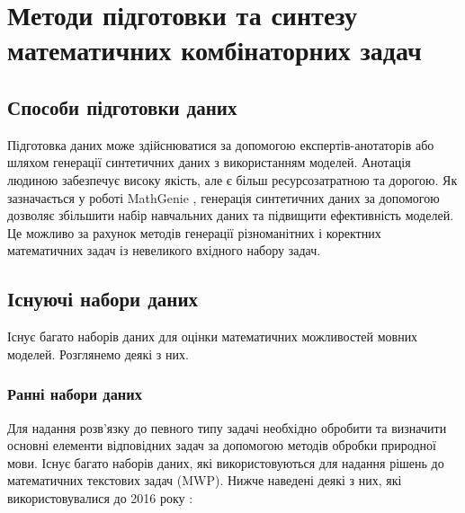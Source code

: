 \chapter{Методи підготовки та синтезу математичних комбінаторних задач}
\label{sec:datasets}

\section{Способи підготовки даних}

Підготовка даних може здійснюватися за допомогою експертів-анотаторів або шляхом генерації синтетичних даних з використанням моделей. Анотація людиною забезпечує високу якість, але є більш ресурсозатратною та дорогою. Як зазначається у роботі MathGenie \cite{lu2024mathgeniegeneratingsyntheticdata}, генерація синтетичних даних за допомогою дозволяє збільшити набір навчальних даних та підвищити ефективність моделей. Це можливо за рахунок методів генерації різноманітних і коректних математичних задач із невеликого вхідного набору задач.

\section{Існуючі набори даних}

Існує багато наборів даних для оцінки математичних можливостей мовних моделей. Розглянемо деякі з них.

\subsection{Ранні набори даних}
Для надання розв'язку до певного типу задачі необхідно обробити та визначити основні елементи відповідних задач за допомогою методів обробки природної мови. Існує багато наборів даних, які використовуються для надання рішень до математичних текстових задач (MWP). Нижче наведені деякі з них, які використовувалися до 2016 року \cite{Nikolaiev202294}:

